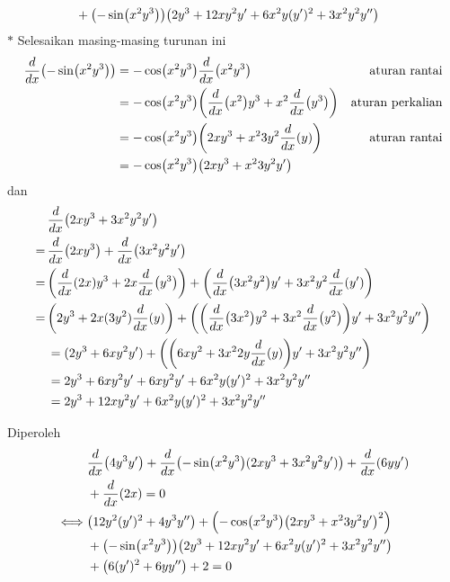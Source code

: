 \begin{enumerate}[leftmargin=*, label={\arabic*}.]
\begin{enumerate}[label={\alph*}.]
\begin{enumerate}[label={\arabic*})]
\begin{align*}
        \\&+\brk*{-\sin\brk*{x^{2}y^{3}}}
        \brk*{2y^{3}+12xy^{2}y'+6x^{2}y(y')^{2}+3x^{2}y^{2}y''}
    \end{align*}
    $*$ Selesaikan masing-masing turunan ini
    \begin{align*}
        \drv{x}{-\sin\brk*{x^{2}y^{3}}}
        &=-\cos\brk*{x^{2}y^{3}}\drv{x}{x^{2}y^{3}}
        &\text{aturan rantai}\\
        &=-\cos\brk*{x^{2}y^{3}}
        \brk*{\drv{x}{x^{2}}y^{3}+x^{2}\drv{x}{y^{3}}}
        &\text{aturan perkalian}\\
        &=-\cos\brk*{x^{2}y^{3}}
        \brk*{2xy^{3}+x^{2}3y^{2}\drv{x}{y}}
        &\text{aturan rantai}\\
        &=-\cos\brk*{x^{2}y^{3}}
        \brk*{2xy^{3}+x^{2}3y^{2}y'}
    \end{align*}
    dan
    \begin{align*}
        &\drv{x}{2xy^{3}+3x^{2}y^{2}y'} \\
        =\,&\drv{x}{2xy^{3}}+\drv{x}{3x^{2}y^{2}y'}\\
        =\,&\brk*{\drv{x}{2x}y^{3}+2x\drv{x}{y^{3}}}
        +\brk*{\drv{x}{3x^{2}y^{2}}y'+3x^{2}y^{2}\drv{x}{y'}}\\
        =\,&\brk*{2y^{3}+2x(3y^2)\drv{x}{y}}
        +\brk*{\brk*{\drv{x}{3x^{2}}y^2+3x^{2}\drv{x}{y^2}}y'
        +3x^{2}y^{2}y''}\\
        &=(2y^{3}+6xy^{2}y')+\brk*{\brk*{6xy^{2}+3x^{2}2y\drv{x}{y}}y'
        +3x^{2}y^{2}y''}\\
        &=2y^{3}+6xy^{2}y'+6xy^{2}y'+6x^{2}y(y')^{2}+3x^{2}y^{2}y''\\
        &=2y^{3}+12xy^{2}y'+6x^{2}y(y')^{2}+3x^{2}y^{2}y''\\
    \end{align*}
    \end{enumerate}
    Diperoleh
    \begin{align*}
        &\drv{x}{4y^{3}y'}+\drv{x}{-\sin\brk*{x^{2}y^{3}}(2xy^{3}+3x^{2}y^{2}y')}
        +\drv{x}{6yy'}\\
        &+\drv{x}{2x}=0\\
        \iff &\brk*{12y^{2}(y')^{2}+4y^{3}y''}
        +\brk*{-\cos\brk*{x^{2}y^{3}}\brk*{2xy^{3}+x^{2}3y^{2}y'}^{2}}
        \\&+\brk*{-\sin\brk*{x^{2}y^{3}}}
        \brk*{2y^{3}+12xy^{2}y'+6x^{2}y(y')^{2}+3x^{2}y^{2}y''}\\
        &+\brk*{6(y')^{2}+6yy''} + 2 = 0
    \end{align*}

\end{enumerate}
\end{enumerate}
